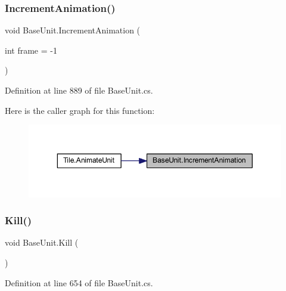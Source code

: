 \subsubsection{\texorpdfstring{IncrementAnimation()}{IncrementAnimation()}}
{\footnotesize\ttfamily void Base\+Unit.\+Increment\+Animation (\begin{DoxyParamCaption}\item[{int}]{frame = {\ttfamily -\/1} }\end{DoxyParamCaption})}



Definition at line 889 of file Base\+Unit.\+cs.

Here is the caller graph for this function\+:
\nopagebreak
\begin{figure}[H]
\begin{center}
\leavevmode
\includegraphics[width=350pt]{class_base_unit_a007c44552627a4ee773771383198077f_icgraph}
\end{center}
\end{figure}
\mbox{\label{class_base_unit_ae32912e26fcd7ea4b251045742064af4}} 
\subsubsection{\texorpdfstring{Kill()}{Kill()}}
{\footnotesize\ttfamily void Base\+Unit.\+Kill (\begin{DoxyParamCaption}{ }\end{DoxyParamCaption})}



Definition at line 654 of file Base\+Unit.\+cs.


